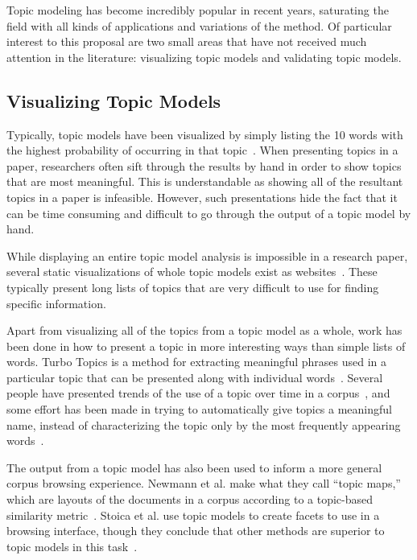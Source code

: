 \documentclass[ms]{byuprop}
\begin{document}
Topic modeling has become incredibly popular in recent years, saturating the
field with all kinds of applications and variations of the method.  Of
particular interest to this proposal are two small areas that have not received
much attention in the literature: visualizing topic models and validating topic
models.

\subsection{Visualizing Topic Models}

Typically, topic models have been visualized by simply listing the 10 words
with the highest probability of occurring in that
topic~\cite{blei-2003-latent-dirichlet-allocation,
griffiths-2004-finding-scientific-topics}.  When presenting topics in a paper,
researchers often sift through the results by hand in order to show topics that
are most meaningful.  This is understandable as showing all of the resultant
topics in a paper is infeasible.  However, such presentations hide the fact
that it can be time consuming and difficult to go through the output of a topic
model by hand.

While displaying an entire topic model analysis is impossible in a research
paper, several static visualizations of whole topic models exist as
websites~\cite{blei-arxiv-corpus-browser, mimno-nyt-browser}.  These typically
present long lists of topics that are very difficult to use for finding
specific information.

Apart from visualizing all of the topics from a topic model as a whole, work
has been done in how to present a topic in more interesting ways than simple
lists of words.  Turbo Topics is a method for extracting meaningful phrases
used in a particular topic that can be presented along with individual
words~\cite{blei-2009-turbo-topics}.  Several people have presented trends of
the use of a topic over time in a
corpus~\cite{griffiths-2004-finding-scientific-topics, mimno-nyt-browser}, and
some effort has been made in trying to automatically give topics a meaningful
name, instead of characterizing the topic only by the most frequently appearing
words~\cite{mei-2007-automatic-labeling-of-topic-models,
lau-2010-best-topic-word-selection}.

The output from a topic model has also been used to inform a more general
corpus browsing experience.  Newmann et al. make what they call ``topic maps,''
which are layouts of the documents in a corpus according to a topic-based
similarity metric~\cite{newman-2010-visualizing-with-topic-maps}.  Stoica et
al. use topic models to create facets to use in a browsing interface, though
they conclude that other methods are superior to topic models in this
task~\cite{stoica-2007-faceted-metadata-structures}.
\end{document}
